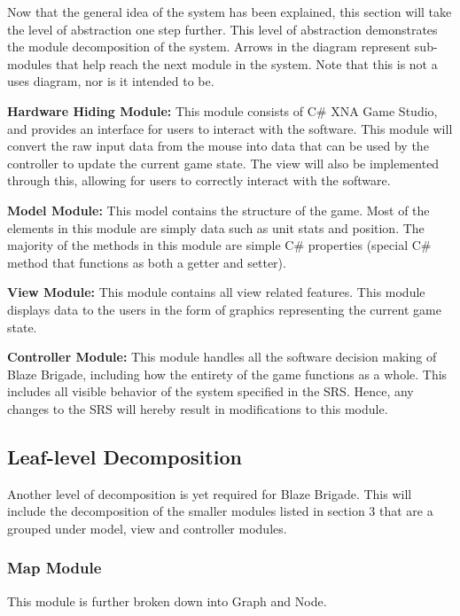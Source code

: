 \documentclass{article}
\begin{document}
Now that the general idea of the system has been explained, this section will take the level of abstraction one step further. This level of abstraction demonstrates the module decomposition of the system. Arrows in the diagram represent sub-modules that help reach the next module in the system. Note that this is not a uses diagram, nor is it intended to be.

\begin{description}[leftmargin=0.2cm]
    \item \textbf{Hardware Hiding Module:} This module consists of C\# XNA Game Studio, and provides an interface for users to interact with the software. This module will convert the raw input data from the mouse into data that can be used by the controller to update the current game state. The view will also be implemented through this, allowing for users to correctly interact with the software.
    \item \textbf{Model Module:} This model contains the structure of the game. Most of the elements in this module are simply data such as unit stats and position. The majority of the methods in this module are simple C\# properties (special C\# method that functions as both a getter and setter).
    \item \textbf{View Module:} This module contains all view related features. This module displays data to the users in the form of graphics representing the current game state.
    \item \textbf{Controller Module:} This module handles all the software decision making of Blaze Brigade, including how the entirety of the game functions as a whole. This includes all visible behavior of the system specified in the SRS. Hence, any changes to the SRS will hereby result in modifications to this module.
    
\end{description}

\subsection{Leaf-level Decomposition}
Another level of decomposition is yet required for Blaze Brigade. This will include the decomposition of the smaller modules listed in section 3 that are a grouped under model, view and controller modules. 

\subsubsection{Map Module}
This module is further broken down into Graph and Node.
\end{document}
